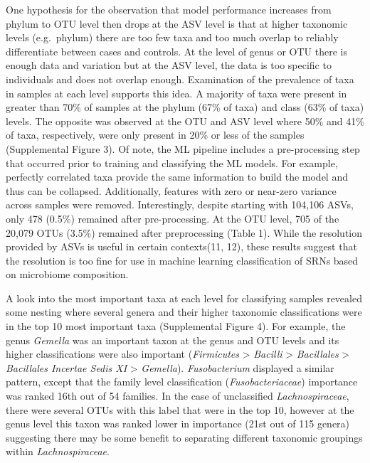 \documentclass[
]{article}
\begin{document}
One hypothesis for the observation that model performance increases from
phylum to OTU level then drops at the ASV level is that at higher
taxonomic levels (e.g.~phylum) there are too few taxa and too much
overlap to reliably differentiate between cases and controls. At the
level of genus or OTU there is enough data and variation but at the ASV
level, the data is too specific to individuals and does not overlap
enough. Examination of the prevalence of taxa in samples at each level
supports this idea. A majority of taxa were present in greater than 70\%
of samples at the phylum (67\% of taxa) and class (63\% of taxa) levels.
The opposite was observed at the OTU and ASV level where 50\% and 41\%
of taxa, respectively, were only present in 20\% or less of the samples
(Supplemental Figure 3). Of note, the ML pipeline includes a
pre-processing step that occurred prior to training and classifying the
ML models. For example, perfectly correlated taxa provide the same
information to build the model and thus can be collapsed. Additionally,
features with zero or near-zero variance across samples were removed.
Interestingly, despite starting with 104,106 ASVs, only 478 (0.5\%)
remained after pre-processing. At the OTU level, 705 of the 20,079 OTUs
(3.5\%) remained after preprocessing (Table 1). While the resolution
provided by ASVs is useful in certain contexts(11, 12), these results
suggest that the resolution is too fine for use in machine learning
classification of SRNs based on microbiome composition.

A look into the most important taxa at each level for classifying
samples revealed some nesting where several genera and their higher
taxonomic classifications were in the top 10 most important taxa
(Supplemental Figure 4). For example, the genus \emph{Gemella} was an
important taxon at the genus and OTU levels and its higher
classifications were also important (\emph{Firmicutes} \textgreater{}
\emph{Bacilli} \textgreater{} \emph{Bacillales} \textgreater{}
\emph{Bacillales Incertae Sedis XI} \textgreater{} \emph{Gemella}).
\emph{Fusobacterium} displayed a similar pattern, except that the family
level classification (\emph{Fusobacteriaceae}) importance was ranked
16th out of 54 families. In the case of unclassified
\emph{Lachnospiraceae}, there were several OTUs with this label that
were in the top 10, however at the genus level this taxon was ranked
lower in importance (21st out of 115 genera) suggesting there may be
some benefit to separating different taxonomic groupings within
\emph{Lachnospiraceae}.
\end{document}
